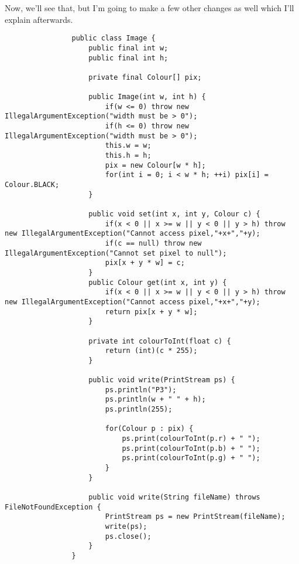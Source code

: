 \documentclass{article}
\begin{document}
            Now, we'll see that, but I'm going to make a few other changes as well which I'll explain afterwards.
            
            \begin{verbatim}
                public class Image {
                    public final int w;
                    public final int h;

                    private final Colour[] pix;

                    public Image(int w, int h) {
                        if(w <= 0) throw new IllegalArgumentException("width must be > 0");
                        if(h <= 0) throw new IllegalArgumentException("width must be > 0");
                        this.w = w;
                        this.h = h;
                        pix = new Colour[w * h];
                        for(int i = 0; i < w * h; ++i) pix[i] = Colour.BLACK;
                    }

                    public void set(int x, int y, Colour c) {
                        if(x < 0 || x >= w || y < 0 || y > h) throw new IllegalArgumentException("Cannot access pixel,"+x+","+y);
                        if(c == null) throw new IllegalArgumentException("Cannot set pixel to null");
                        pix[x + y * w] = c;
                    }
                    public Colour get(int x, int y) {
                        if(x < 0 || x >= w || y < 0 || y > h) throw new IllegalArgumentException("Cannot access pixel,"+x+","+y);
                        return pix[x + y * w];
                    }

                    private int colourToInt(float c) {
                        return (int)(c * 255);
                    }

                    public void write(PrintStream ps) {
                        ps.println("P3");
                        ps.println(w + " " + h);
                        ps.println(255);
        
                        for(Colour p : pix) {
                            ps.print(colourToInt(p.r) + " ");
                            ps.print(colourToInt(p.b) + " ");
                            ps.print(colourToInt(p.g) + " ");
                        }
                    }
    
                    public void write(String fileName) throws FileNotFoundException {
                        PrintStream ps = new PrintStream(fileName);
                        write(ps);
                        ps.close();
                    }
                }
            \end{verbatim}
        
\end{document}
